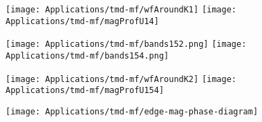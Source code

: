 \begin{figure}[H]
\hspace{1cm}
\texttt{[image: Applications/tmd-mf/wfAroundK1]}
\texttt{[image: Applications/tmd-mf/magProfU14]}
	\caption[]{}
	\label{fig:wfs}
\end{figure}
\begin{figure}[H]
\hspace{1.2cm}
\texttt{[image: Applications/tmd-mf/bands152.png]}
\hspace{4mm}
\texttt{[image: Applications/tmd-mf/bands154.png]}
	\caption[]{}
	\label{fig:wfs}
\end{figure}
\begin{figure}[H]
\hspace{1cm}
\texttt{[image: Applications/tmd-mf/wfAroundK2]}
\texttt{[image: Applications/tmd-mf/magProfU154]}
	\caption[]{}
	\label{fig:wfs}
\end{figure}
\begin{figure}[H]
\centering
\texttt{[image: Applications/tmd-mf/edge-mag-phase-diagram]}
	\caption[]{}
	\label{fig:wfs}
\end{figure}